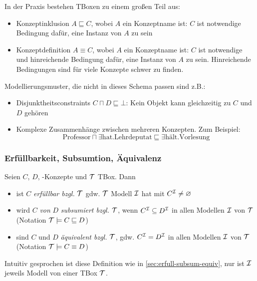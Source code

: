 In der Praxis bestehen TBoxen zu einem großen Teil aus:

\begin{itemize}
\item Konzeptinklusion $A \sqsubseteq C$, wobei $A$ ein Konzeptname ist: $C$ ist notwendige Bedingung dafür, eine Instanz von $A$ zu sein
\item Konzeptdefinition $A \equiv C$, wobei $A$ ein Konzeptname ist: $C$ ist notwendige und hinreichende Bedingung dafür, eine Instanz von $A$ zu sein.
    Hinreichende Bedingungen sind für viele Konzepte schwer zu finden.
    \end{itemize}
Modellierungsmuster, die nicht in dieses Schema passen sind z.B.:
\begin{itemize}
\item Disjunktheitsconstraints $C \sqcap D \sqsubseteq \bot$: Kein Objekt kann gleichzeitig zu $C$ und $D$ gehören
\item Komplexe Zusammenhänge zwischen mehreren Konzepten. Zum Beispiel:
    \[
        \text{Professor} \sqcap \exists \text{hat}.\text{Lehrdeputat} \sqsubseteq \exists \text{hält}.\text{Vorlesung}
    \]
\end{itemize}

\subsubsection{Erfüllbarkeit, Subsumtion, Äquivalenz}
\label{sec:tbox-erfuellbarkeit}
\label{erfuxfcllbarkeit-subsumtion-uxe4quivalenz-1}

\begin{definition} 
Seien $C$, $D$, \ALC-Konzepte und $\mathcal{T}$ TBox. Dann

\begin{itemize}
  \item ist $C$ \emph{erfüllbar bzgl.} $\mathcal{T}$ gdw. $\mathcal{T}$ Modell $\mathcal{I}$ hat mit $C^{\mathcal{I}} \neq \varnothing$
  \item wird $C$ \emph{von} $D$ \emph{subsumiert bzgl.} $\mathcal{T}$, wenn $C^{\mathcal{I}} \subseteq D^{\mathcal{I}}$ in allen Modellen $\mathcal{I}$ von $\mathcal{T}$ (Notation $\mathcal{T} \models C \sqsubseteq D$)
  \item sind $C$ und $D$ \emph{äquivalent bzgl.} $\mathcal{T}$, gdw. $C^{\mathcal{I}} = D^{\mathcal{I}}$ in allen Modellen $\mathcal{I}$ von $\mathcal{T}$ (Notation $\mathcal{T} \models C \equiv D$)
\end{itemize}
\end{definition}

Intuitiv gesprochen ist diese Definition wie in
\autoref{sec:erfull-subsum-equiv}, nur ist $\mathcal{I}$ jeweils Modell von einer TBox
$\mathcal{T}$.

